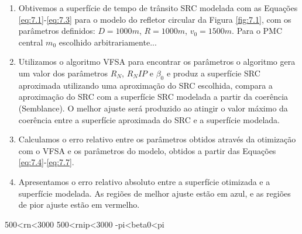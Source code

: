 \begin{enumerate}
 \item Obtivemos a superfície de tempo de trânsito SRC modelada com as Equações \ref{eq:7.1}-\ref{eq:7.3}
 para o modelo do refletor circular da Figura \ref{fig:7.1}, com os parâmetros definidos: $D=1000m$, $R=1000m$, 
 $v_0=1500m$. Para o PMC central $m_0$ escolhido arbitrariamente...
 
 \item Utilizamos o algoritmo VFSA para encontrar os parâmetros o algoritmo gera um valor dos parâmetros $R_N$, $R_NIP$ e $\beta_0$
 e produz a superfície SRC aproximada utilizando uma aproximação do SRC escolhida, compara a aproximação do SRC com
 a superfície SRC modelada a partir da coerência (Semblance). O melhor ajuste será produzido ao atingir o valor máximo da
 coerência entre a superfície aproximada do SRC e a superfície modelada.
 
 \item Calculamos o erro relativo entre os parâmetros obtidos através da otimização com o VFSA
 e os parâmetros do modelo, obtidos a partir
 das Equações \ref{eq:7.4}-\ref{eq:7.7}. 
 
 \item Apresentamos o erro relativo absoluto entre a superfície otimizada e
 a superfície modelada. As regiões de melhor ajuste estão em azul, e as regiões de pior ajuste estão em vermelho.

\end{enumerate}




500<rn<3000
500<rnip<3000
-pi<beta0<pi
